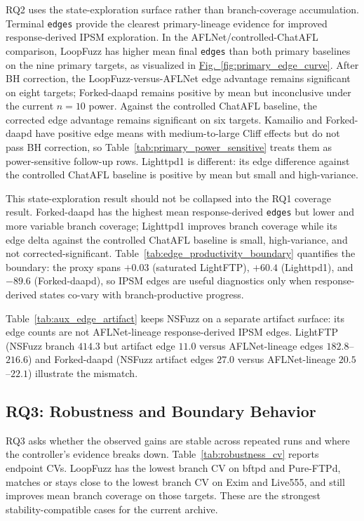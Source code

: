 \documentclass[final,5p,times,number]{elsarticle}
\newcommand{\figref}[1]{\hyperref[#1]{Fig.~\ref*{#1}}}
\begin{document}
RQ2 uses the state-exploration surface rather than branch-coverage accumulation. Terminal \texttt{edges} provide the clearest primary-lineage evidence for improved response-derived IPSM exploration. In the AFLNet/controlled-ChatAFL comparison, LoopFuzz has higher mean final \texttt{edges} than both primary baselines on the nine primary targets, as visualized in \figref{fig:primary_edge_curve}. After BH correction, the LoopFuzz-versus-AFLNet edge advantage remains significant on eight targets; Forked-daapd remains positive by mean but inconclusive under the current $n=10$ power. Against the controlled ChatAFL baseline, the corrected edge advantage remains significant on six targets. Kamailio and Forked-daapd have positive edge means with medium-to-large Cliff effects but do not pass BH correction, so Table~\ref{tab:primary_power_sensitive} treats them as power-sensitive follow-up rows. Lighttpd1 is different: its edge difference against the controlled ChatAFL baseline is positive by mean but small and high-variance.

This state-exploration result should not be collapsed into the RQ1 coverage result. Forked-daapd has the highest mean response-derived \texttt{edges} but lower and more variable branch coverage; Lighttpd1 improves branch coverage while its edge delta against the controlled ChatAFL baseline is small, high-variance, and not corrected-significant. Table~\ref{tab:edge_productivity_boundary} quantifies the boundary: the proxy spans $+0.03$ (saturated LightFTP), $+60.4$ (Lighttpd1), and $-89.6$ (Forked-daapd), so IPSM edges are useful diagnostics only when response-derived states co-vary with branch-productive progress.

Table~\ref{tab:aux_edge_artifact} keeps NSFuzz on a separate artifact surface: its edge counts are not AFLNet-lineage response-derived IPSM edges. LightFTP (NSFuzz branch $414.3$ but artifact edge $11.0$ versus AFLNet-lineage edges $182.8$--$216.6$) and Forked-daapd (NSFuzz artifact edges $27.0$ versus AFLNet-lineage $20.5$--$22.1$) illustrate the mismatch.

\subsection{RQ3: Robustness and Boundary Behavior}

RQ3 asks whether the observed gains are stable across repeated runs and where the controller's evidence breaks down. Table~\ref{tab:robustness_cv} reports endpoint CVs. LoopFuzz has the lowest branch CV on bftpd and Pure-FTPd, matches or stays close to the lowest branch CV on Exim and Live555, and still improves mean branch coverage on those targets. These are the strongest stability-compatible cases for the current archive.
\end{document}
